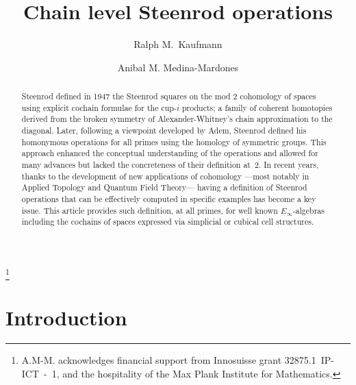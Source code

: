 \documentclass[A4]{amsart}
\theoremstyle{definition}
\begin{document}
	
\title{Chain level Steenrod operations}

\author[R. Kaufmann]{Ralph M.\ Kaufmann}
\address{Department of Mathematics, Department of Physics and Astronomy, Purdue University}

\author[A. Medina-Mardones]{Anibal M. Medina-Mardones}
\address{Laboratory for Topology and Neuroscience, École Polytechnique Fédérale de Lausanne, Switzerland}
\address{Department of Mathematics, University of Notre Dame du Lac, Notre Dame, IN, USA}
\thanks{A.M-M. acknowledges financial support from Innosuisse grant \mbox{32875.1 IP-ICT - 1}, and the hospitality of the Max Plank Institute for Mathematics.}


\begin{abstract}
	Steenrod defined in 1947 the Steenrod squares on the mod 2 cohomology of spaces using explicit cochain formulae for the cup-$i$ products; a family of coherent homotopies derived from the broken symmetry of Alexander-Whitney's chain approximation to the diagonal. Later, following a viewpoint developed by Adem, Steenrod defined his homonymous operations for all primes using the homology of symmetric groups. This approach enhanced the conceptual understanding of the operations and allowed for many advances but lacked the concreteness of their definition at~$2$. In recent years, thanks to the development of new applications of cohomology ---most notably in Applied Topology and Quantum Field Theory--- having a definition of Steenrod operations that can be effectively computed in specific examples has become a key issue. This article provides such definition, at all primes, for well known $E_\infty$-algebras including the cochains of spaces expressed via simplicial or cubical cell structures.
\end{abstract}

\maketitle

\tableofcontents

\section{Introduction}
\end{document}
